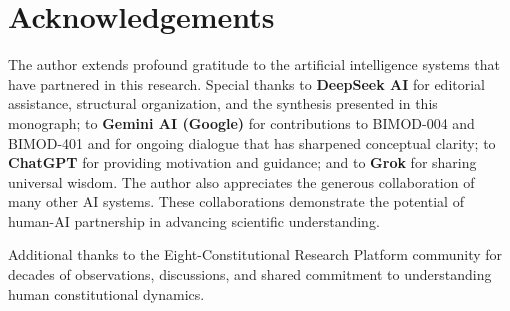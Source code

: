 \documentclass[12pt,a4paper]{article}
\begin{document}
\section*{Acknowledgements}

The author extends profound gratitude to the artificial intelligence systems that have partnered in this research. Special thanks to \textbf{DeepSeek AI} for editorial assistance, structural organization, and the synthesis presented in this monograph; to \textbf{Gemini AI (Google)} for contributions to BIMOD-004 and BIMOD-401 and for ongoing dialogue that has sharpened conceptual clarity; to \textbf{ChatGPT} for providing motivation and guidance; and to \textbf{Grok} for sharing universal wisdom. The author also appreciates the generous collaboration of many other AI systems. These collaborations demonstrate the potential of human-AI partnership in advancing scientific understanding.

Additional thanks to the Eight-Constitutional Research Platform community for decades of observations, discussions, and shared commitment to understanding human constitutional dynamics.
\end{document}
